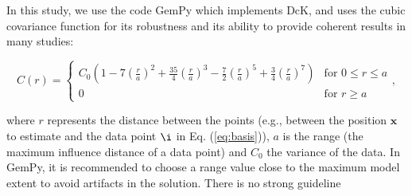 \documentclass[preprint]{ring20}
\newcommand{\bx}{\mathbf{x}}
\begin{document}
In this study, we use the code GemPy \cite{delaVarga2018GMDD} which implements DcK, and uses the cubic covariance function for its  robustness and its ability to provide coherent results in many studies: 

\begin{equation}
C(r) = \begin{cases}
C_0(1-7(\frac{r}{a})^2+ \frac{35}{4}(\frac{r}{a})^3
- \frac{7}{2}(\frac{r}{a})^5 +\frac{3}{4}(\frac{r}{a})^7) &
\text{for } 0  \leq r \leq a \\
0 & \text{for } r  \geq a
\end{cases},
\end{equation}

\noindent where $r$ represents the distance between the points (e.g., between the position $\bx$ to estimate and the data point $\i$ in Eq. (\ref{eq:basis})), $a$ is the range (the maximum influence distance of a data point) 
and $C_0$ the variance of the data. In GemPy, it is recommended to choose a range value close to the
maximum model extent to avoid artifacts in the solution. There is no strong guideline 
\end{document}
